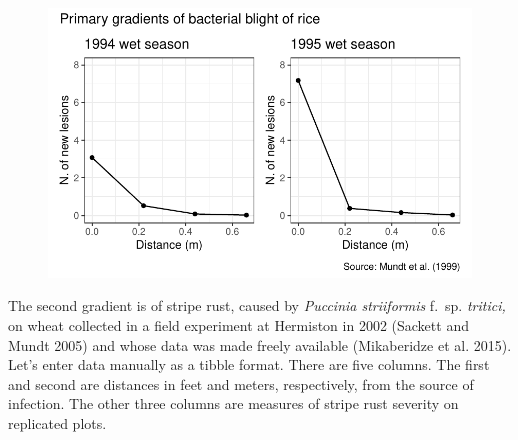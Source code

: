 \documentclass[
  letterpaper,
  DIV=11,
  numbers=noendperiod]{scrreprt}
\begin{document}
\begin{figure}[H]

{\centering \includegraphics{./spatial-gradients_files/figure-pdf/unnamed-chunk-2-1.pdf}

}

\end{figure}

The second gradient is of stripe rust, caused by \emph{Puccinia
striiformis} f.~sp. \emph{tritici,} on wheat collected in a field
experiment at Hermiston in 2002 (Sackett and Mundt 2005) and whose data
was made freely available (Mikaberidze et al. 2015). Let's enter data
manually as a tibble format. There are five columns. The first and
second are distances in feet and meters, respectively, from the source
of infection. The other three columns are measures of stripe rust
severity on replicated plots.
\end{document}
